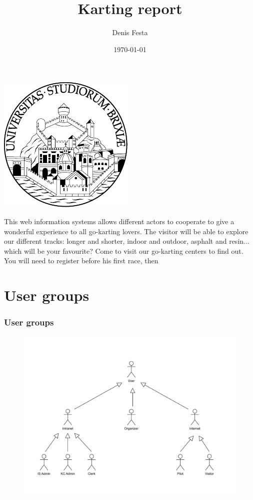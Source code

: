 \documentclass{beamer}
\title{Karting report}
\author{Denis Festa}
\date{\today}
\begin{document}
\begin{frame}
    \titlepage
    \centering
    \includegraphics[width=0.2\linewidth]{unibs-circ-logo.pdf}
\end{frame}


\begin{frame}
This web information systems allows different actors to cooperate
to give a wonderful experience to all go-karting lovers.
The visitor will be able to explore our different tracks: longer and shorter,
indoor and outdoor, asphalt and resin... which will be your favourite? Come to visit our 
go-karting centers to find out.
You will need to register before his first race, then 
\end{frame}



\section*{User groups}

\begin{frame}
\frametitle{User groups}
\begin{figure}
    \centering
    \includegraphics[width=0.8\linewidth]{drawio/users-uc.pdf}
\end{figure}
\end{frame}
\end{document}
